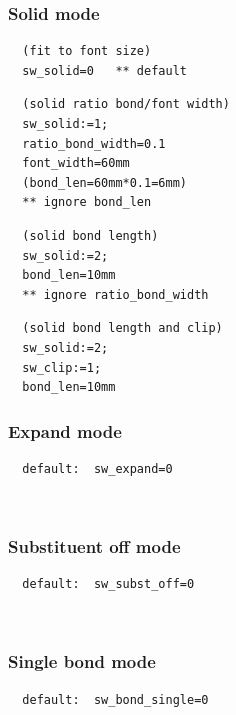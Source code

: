 \documentclass[a4paper]{article}
\makeatletter
\def\MCFstructure{\hspace{5mm}{\@strufont\char\fontnum}\advance\fontnum\@ne\relax}%
\makeatother
\begin{document}
\subsubsection{Solid mode}
\begin{verbatim}
  (fit to font size)
  sw_solid=0   ** default
\end{verbatim}
\MCFstructure
\begin{verbatim}
  (solid ratio bond/font width)
  sw_solid:=1;
  ratio_bond_width=0.1
  font_width=60mm
  (bond_len=60mm*0.1=6mm)
  ** ignore bond_len
\end{verbatim}
\MCFstructure
\begin{verbatim}
  (solid bond length)
  sw_solid:=2; 
  bond_len=10mm
  ** ignore ratio_bond_width
\end{verbatim}
\MCFstructure
\begin{verbatim}
  (solid bond length and clip)
  sw_solid:=2;
  sw_clip:=1;
  bond_len=10mm
\end{verbatim}
\MCFstructure
\subsubsection{Expand mode}
\begin{verbatim}
  default:  sw_expand=0
\end{verbatim}
\MCFstructure\\
\makebox[5mm]{}%
%
%
\subsubsection{Substituent off mode}
\begin{verbatim}
  default:  sw_subst_off=0
\end{verbatim}
\MCFstructure\\
\makebox[5mm]{}%
%
%
\subsubsection{Single bond mode}
\begin{verbatim}
  default:  sw_bond_single=0
\end{verbatim}
\MCFstructure\\
\makebox[5mm]{}%
%
%
\end{document}
